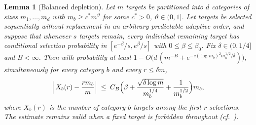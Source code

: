 \documentclass[11pt]{article}
\newcommand{\1}{\mathbf{1}}
\newtheorem{lemma}[theorem]{Lemma}
\theoremstyle{remark}
\begin{document}
\begin{lemma}[Balanced depletion]\label{lem:balance}
Let $m$ targets be partitioned into $d$ categories of sizes $m_1,\dots,m_d$
with $m_b\ge c^*m^\vartheta$ for some $c^*>0$, $\vartheta\in(0,1]$. Let
targets be selected sequentially without replacement in an arbitrary
predictable adaptive order, and suppose that whenever $s$ targets remain,
every individual remaining target has conditional selection probability in
$[e^{-\beta}/s,e^{\beta}/s]$ with $0\le\beta\le\beta_0$. Fix
$\delta\in(0,1/4]$ and $B<\infty$. Then with probability at least
$1-O\bigl(d\,(m^{-B}+e^{-c(\log m_b)^2m_b^{1/2}/\delta})\bigr)$,
simultaneously for every category $b$ and every $r\le\delta m$,
\begin{equation}\label{eq:balance}
\Bigl|\,X_b(r)-\frac{rm_b}{m}\Bigr|
\;\le\;C_B\Bigl(\beta+\frac{\sqrt{\delta\log m}}{m_b^{1/4}}
+\frac{1}{m_b^{1/2}}\Bigr)m_b,
\end{equation}
where $X_b(r)$ is the number of category-$b$ targets among the first $r$
selections. The estimate remains valid when a fixed target is forbidden
throughout (cf.\ \cite[Lemma~6.7]{Lon26}).
\end{lemma}
\end{document}
